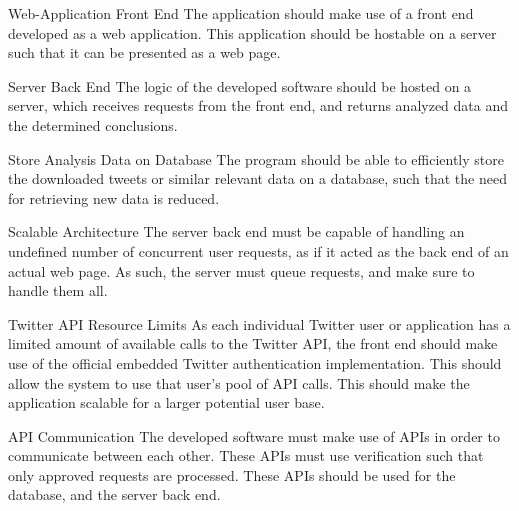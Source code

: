 \begin{requirement}{Web-Application Front End}
The application should make use of a front end developed as a web application.
This application should be hostable on a server such that it can be presented as
a web page.
\end{requirement}

\begin{requirement}{Server Back End}
The logic of the developed software should be hosted on a server, which receives
requests from the front end, and returns analyzed data and the determined
conclusions.
\end{requirement}

\begin{requirement}{Store Analysis Data on Database}
The program should be able to efficiently store the downloaded tweets or
similar relevant data on a database, such that the need for retrieving new data
is reduced.
\end{requirement}

\begin{requirement}{Scalable Architecture}
The server back end must be capable of handling an undefined number of
concurrent user requests, as if it acted as the back end of an actual web page. As such,
the server must queue requests, and make sure to handle them all.
\end{requirement}

\begin{requirement}{Twitter API Resource Limits}
As each individual Twitter user or application has a limited amount of available
calls to the Twitter API, the front end should make use of the official
embedded Twitter authentication implementation. This should allow the system to
use that user's pool of API calls. This should make the application scalable for
a larger potential user base.
\end{requirement}

\begin{requirement}{\ac{API} Communication}
The developed software must make use of \ac{API}s in order to communicate between
each other. These \ac{API}s must use verification such that only approved
requests are processed. These \ac{API}s should be used for the database, and the server back
end.
\end{requirement}




